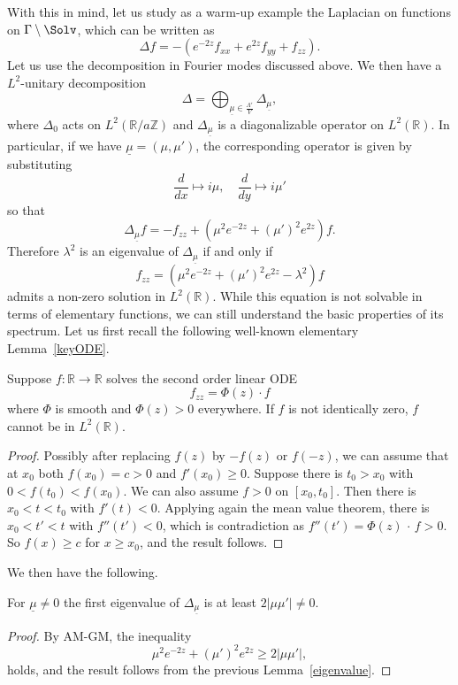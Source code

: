 With this in mind, let us study as a warm-up example the Laplacian on functions on $\Gamma\setminus\Solv$, which can be written as
\[
\Delta f=-\left(e^{-2z}f_{xx}+e^{2z}f_{yy}+f_{zz}\right).
\]
Let us use the decomposition in Fourier modes discussed above. We then have a $L^2$-unitary decomposition
\[
\Delta=\bigoplus_{\underline{\mu}\in \frac{\Lambda'}{V}} \Delta_{\underline{\mu}},
\]
where $\Delta_{0}$ acts on $L^2(\mathbb{R}/a\mathbb{Z})$ and $\Delta_{\underline{\mu}}$ is a diagonalizable operator on $L^2(\mathbb{R})$. In particular, if we have $\underline{\mu}=(\mu,\mu')$, the corresponding operator is given by substituting
\[
\frac{d}{dx}\mapsto i\mu,\quad\frac{d}{dy}\mapsto i\mu'
\]
so that
\[
\Delta_{\underline{\mu}} f=-f_{zz}+\left(\mu^2 e^{-2z}+(\mu')^2e^{2z}\right)f.
\]
Therefore $\lambda^2$ is an eigenvalue of $\Delta_{\underline{\mu}}$ if and only if
\[
f_{zz}=\left(\mu^2 e^{-2z}+(\mu')^2e^{2z}-\lambda^2\right)f
\]
admits a non-zero solution in $L^2(\mathbb{R})$. While this equation is not solvable in terms of elementary functions, we can still understand the basic properties of its spectrum. Let us first recall the following well-known elementary Lemma~\ref{keyODE}.

\begin{lemm}\label{keyODE}
Suppose $f:\mathbb{R}\rightarrow\mathbb{R}$ solves the second order linear ODE
\[
f_{zz}=\Phi(z)\cdot f
\]
where $\Phi$ is smooth and $\Phi(z)>0$ everywhere. If $f$ is not identically zero, $f$ cannot be in $L^2(\mathbb{R})$.
\end{lemm}

\begin{proof}
Possibly after replacing $f(z)$ by $-f(z)$ or $f(-z)$, we can assume that at $x_0$ both $f(x_0)=c>0$ and $f'(x_0)\geq0$. Suppose there is $t_0>x_0$ with $0<f(t_0)<f(x_0)$. We can also assume $f>0$ on $[x_0,t_0]$. Then there is $x_0<t<t_0$ with $f'(t)<0$. Applying again the mean value theorem, there is $x_0<t'<t$ with $f''(t')<0$, which is contradiction as $f''(t')=\Phi(z)\,\cdot\,f>0$. So $f(x)\geq c$ for $x\geq x_0$, and the result follows.
\end{proof}

We then have the following.

\begin{lemm}\label{eigenvalue}
For $\underline{\mu}\neq0$ the first eigenvalue of $\Delta_{\underline{\mu}}$ is at least $2|\mu\mu'|\neq0$.
\end{lemm}


\begin{proof}
By \textsc{AM-GM}, the inequality
\[
\mu^2 e^{-2z}+(\mu')^2e^{2z}\geq 2|\mu\mu'|,
\]
holds, and the result follows from the previous Lemma~\ref{eigenvalue}.
\end{proof}

